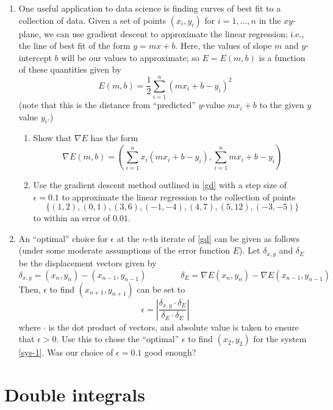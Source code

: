 \documentclass[12pt]{article}
\numberwithin{equation}{subsection}
\numberwithin{figure}{subsection}
\theoremstyle{note}
\begin{document}
{\begin{enumerate}[label=\arabic*.]
\item One useful application to data science is finding curves of best fit to a collection of data. Given a set of points $(x_i,y_i)$ for $i=1,\dots,n$ in the $xy$-plane, we can use gradient descent to approximate the linear regression; i.e., the line of best fit of the form $y=mx+b$. Here, the values of slope $m$ and $y$-intercept $b$ will be our values to approximate; so $E=E(m,b)$ is a function of these quantities given by \begin{equation} E(m,b)= \dfrac{1}{2} \sum_{i=1}^n \left( mx_i +b -y_i \right)^2\end{equation} 
(note that this is the distance from ``predicted'' $y$-value $m x_i+b$ to the given $y$ value $y_i$.)
\begin{enumerate}
	\item Show that $\nabla E$ has the form \begin{equation} \nabla E(m,b)=\left( \sum_{i=1}^n x_i (mx_i+b-y_i), \sum_{i=1}^n mx_i +b-y_i\right)\end{equation}
	\item Use the gradient descent method outlined in \eqref{gd} with a step size of $\epsilon=0.1$ to approximate the linear regression to the collection of points \[\{ (1,2), (0,1), (3,6), (-1,-4), (4,7), (5,12), (-3,-5)\}\] to within an error of $0.01$.
\end{enumerate}

\item An ``optimal'' choice for $\epsilon$ at the $n$-th iterate of \eqref{gd} can be given as follows (under some moderate assumptions of the error function $E$). Let $\delta_{x,y}$ and $\delta_{E}$ be the displacement vectors given by \[ \delta_{x,y}=(x_n, y_n)-(x_{n-1},y_{n-1}) \qquad \qquad \delta_{E}=\nabla E(x_n,y_n)-\nabla E(x_{n-1},y_{n-1})\]
Then, $\epsilon$ to find $(x_{n+1},y_{n+1})$ can be set to \begin{equation} \epsilon = \left| \dfrac{ \delta_{x,y} \cdot \delta_E }{\delta_E \cdot \delta_E} \right|\end{equation} where $\cdot$ is the dot product of vectors, and absolute value is taken to ensure that $\epsilon>0$. Use this to chose the ``optimal'' $\epsilon$ to find $(x_2,y_2)$ for the system \eqref{sys-1}. Was our choice of $\epsilon=0.1$ good enough?
\end{enumerate}

\section{Double integrals}


}
\end{document}
